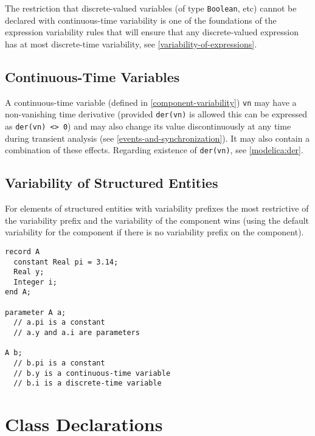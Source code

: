 \begin{nonnormative}
The restriction that discrete-valued variables (of type \lstinline!Boolean!, etc) cannot be declared with continuous-time variability is one of the foundations of the expression variability rules that will ensure that any discrete-valued expression has at most discrete-time variability, see \cref{variability-of-expressions}.
\end{nonnormative}


\subsection{Continuous-Time Variables}\label{continuous-time-variables}

A continuous-time variable (defined in \cref{component-variability}) \lstinline!vn! may have a non-vanishing time derivative (provided \lstinline!der(vn)! is allowed this can be expressed as \lstinline!der(vn) <> 0!) and may also change its value discontinuously at any time during transient analysis (see \cref{events-and-synchronization}).
It may also contain a combination of these effects.
Regarding existence of \lstinline!der(vn)!, see \cref{modelica:der}.


\subsection{Variability of Structured Entities}\label{variability-of-structured-entities}

For elements of structured entities with variability prefixes the most restrictive of the variability prefix and the variability of the component wins (using the default variability for the component if there is no variability prefix on the component).

\begin{example}
\begin{lstlisting}[language=modelica]
record A
  constant Real pi = 3.14;
  Real y;
  Integer i;
end A;

parameter A a;
  // a.pi is a constant
  // a.y and a.i are parameters

A b;
  // b.pi is a constant
  // b.y is a continuous-time variable
  // b.i is a discrete-time variable
\end{lstlisting}
\end{example}


\section{Class Declarations}\label{class-declarations}

